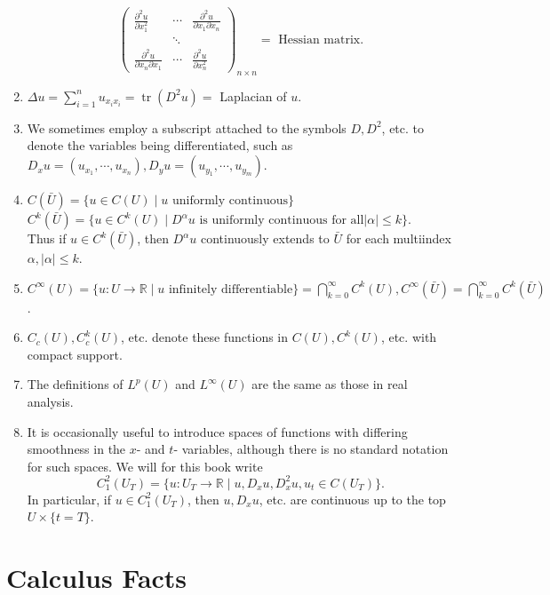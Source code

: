\documentclass[hyperref,UTF8,12pt]{article}
\numberwithin{equation}{subsection}
\theoremstyle{plain}
\theoremstyle{definition}
\numberwithin{theorem}{section}
\numberwithin{lemma}{section}
\numberwithin{proposition}{section}
\numberwithin{remark}{section}
\numberwithin{corollary}{section}
\numberwithin{definition}{section}
\numberwithin{problem}{section}
\numberwithin{example}{section}
\newcommand{\dis}{\displaystyle}
\newcommand{\ptl}{\partial}
\newcommand{\mr}{\mathbb{R}}
\renewcommand{\leq}{\leqslant}
\newcommand{\tr}{\operatorname{tr}}
\begin{document}
\begin{appendices}
\begin{enumerate}
\[\begin{pmatrix}
	\frac{\ptl^2 u}{\ptl x_1^2}&\cdots&\frac{\ptl^2 u}{\ptl x_1\ptl x_n}\\
	&\ddots&\\
	\frac{\ptl^2 u}{\ptl x_n\ptl x_1}&\cdots&\frac{\ptl^2 u}{\ptl x_n^2}
\end{pmatrix}_{n\times n}=\text{~Hessian matrix}.\]
\item $\dis\Delta u=\sum_{i=1}^nu_{x_ix_i}=\tr(D^2u)=$ Laplacian of $u$.
\item We sometimes employ a subscript attached to the symbols $D,D^2$, etc. to denote the variables being differentiated, such as $D_xu=(u_{x_1},\cdots,u_{x_n}),D_yu=(u_{y_1},\cdots,u_{y_m})$.
\item $C(\bar{U})=\{u \in C(U) \mid u \text{~uniformly continuous} \}$\\
$C^k(\bar{U})=\{u \in C^k(U) \mid D^\alpha u \text{~is uniformly continuous for all} |\alpha| \leq k\}$.\\
Thus if $u\in C^k(\bar{U})$, then $D^\alpha u$ continuously extends to $\bar{U}$ for each multiindex $\alpha,|\alpha|\leq k$.
\item $C^\infty(U)=\{u:U\to\mr\mid u \text{~infinitely differentiable}\}=\dis\bigcap_{k=0}^{\infty}C^k(U),C^\infty(\bar{U})=\bigcap_{k=0}^{\infty}C^k(\bar{U})$.
\item $C_c(U),C_c^k(U)$, etc. denote these functions in $C(U),C^k(U)$, etc. with compact support.
\item The definitions of $L^p(U)$ and $L^\infty(U)$ are the same as those in real analysis.
\item It is occasionally useful to introduce spaces of functions with differing smoothness in the $x$- and $t$- variables, although there is no standard notation for such spaces. We will for this book write
\[C_1^2(U_T)=\{u: U_T\to\mr\mid u,D_xu,D_x^2 u,u_t\in C(U_T)\}.\]
In particular, if $u\in C_1^2(U_T)$, then $u,D_xu$, etc. are continuous up to the top $U \times\{t=T\}$.
\end{enumerate}

\newpage
\section{Calculus Facts}

\end{appendices}
\end{document}
